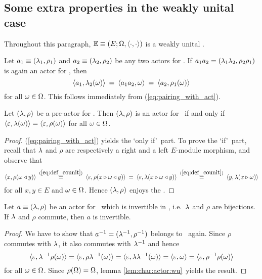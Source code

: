 \subsection{Some extra properties in the weakly unital case}
\label{par:wu:extra}

Throughout this paragraph, $\mathbb{E} \equiv (E; \Omega, \langle\cdot, \cdot\rangle)$ is a weakly unital \context.


\begin{lemma}
Let\/ $a_1 \equiv (\lambda_1,\rho_1)$ and\/ $a_2 \equiv (\lambda_2,\rho_2)$ be any two actors for\/ \EE\@.
If\/ $a_1 a_2 = (\lambda_1\lambda_2, \rho_2\rho_1)$ is again an actor for \EE, then
\begin{equation} \label{eq:canonical_actions:extended}
     \langle a_1,\lambda_2(\omega) \rangle \:=\: \langle a_1 a_2,\omega \rangle \:=\: \langle a_2,\rho_1(\omega) \rangle
\end{equation}
for all\/ $\omega \in \Omega$.
\rm This follows immediately from (\ref{eq:pairing_with_act}).
\end{lemma}


\begin{lemma} \label{lem:char:actor:wu}
  Let\/ $(\lambda,\rho)$ be a pre-actor for \EE\@.
  Then $(\lambda,\rho)$ is an actor for \EE\
  if and only if\/ $\langle \varepsilon,\lambda(\omega) \rangle = \langle \varepsilon,\rho(\omega) \rangle$
  for all\/ $\omega \in \Omega$.
\end{lemma}
\begin{proof}
  (\ref{eq:pairing_with_act}) yields the \lq only if\rq\ part.
  To prove the \lq if\rq\ part, recall that $\lambda$ and $\rho$ are respectively
  a right and a left $E$-module morphism, and observe that
  $$       \langle x,\rho(\omega \triangleleft y) \rangle
     \:\stackrel{\rm (\ref{eq:def_counit})}{=}\:
           \langle \varepsilon,\rho(x \triangleright \omega \triangleleft y) \rangle
     \:=\: \langle \varepsilon,\lambda(x \triangleright \omega \triangleleft y) \rangle
     \: \stackrel{\rm (\ref{eq:def_counit})}{=} \:
            \langle y,\lambda(x \triangleright \omega) \rangle $$
  for all $x,y \in E$ and $\omega \in \Omega$.
  Hence $(\lambda,\rho)$ enjoys the \biap.
\end{proof}


\begin{lemma} \label{lem:comm_implies_invertible}
Let $a\equiv(\lambda,\rho)$ be an actor for\/ \EE\ which is invertible in\/ \PreE,
i.e.\ $\lambda$ and $\rho$ are bijections.
If\/ $\lambda$ and\/ $\rho$ commute, then\/ $a$ is\/ \EEdash invertible.
\end{lemma}
\begin{proof}
We have to show that $a^{-1}=(\lambda^{-1},\rho^{-1})$ belongs to \ActE\ again.
Since $\rho$ commutes with $\lambda$, it also commutes with $\lambda^{-1}$ and hence
  $$  \langle \varepsilon,\lambda^{-1}\rho(\omega) \rangle
        = \langle \varepsilon,\rho\lambda^{-1}(\omega) \rangle
        = \langle \varepsilon,\lambda\lambda^{-1}(\omega) \rangle
        = \langle \varepsilon,\omega \rangle
        = \langle \varepsilon,\rho^{-1}\rho(\omega) \rangle  $$
for all $\omega \in \Omega$.
Since $\rho(\Omega) = \Omega$, lemma \ref{lem:char:actor:wu}\ yields the result.
\end{proof}


